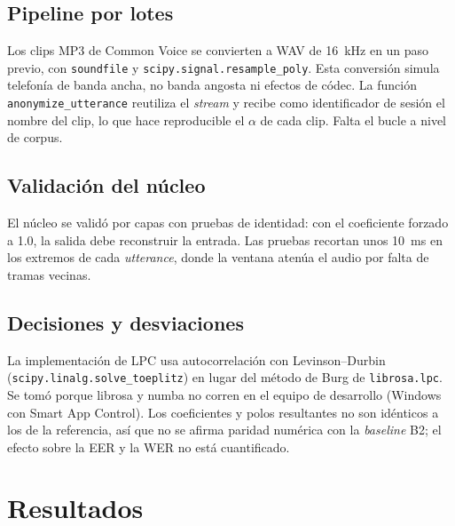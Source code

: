 \subsection{Pipeline por lotes}
Los clips MP3 de Common Voice se convierten a WAV de 16~kHz en un paso previo, 
con \texttt{soundfile} y \texttt{scipy.signal.resample\_poly}. Esta conversión 
simula telefonía de banda ancha, no banda angosta ni efectos de códec. La función 
\texttt{anonymize\_utterance} reutiliza el \textit{stream} y recibe como identificador 
de sesión el nombre del clip, lo que hace reproducible el $\alpha$ de cada clip. 
Falta el bucle a nivel de corpus.

\subsection{Validación del núcleo}
El núcleo se validó por capas con pruebas de identidad: con el coeficiente forzado a 1.0, 
la salida debe reconstruir la entrada. Las pruebas recortan unos 10~ms en los extremos de 
cada \textit{utterance}, donde la ventana atenúa el audio por falta de tramas vecinas.

\subsection{Decisiones y desviaciones}
La implementación de LPC usa autocorrelación con Levinson--Durbin (\texttt{scipy.linalg.solve\_toeplitz}) 
en lugar del método de Burg de \texttt{librosa.lpc}. Se tomó porque librosa y numba no corren en el equipo 
de desarrollo (Windows con Smart App Control). Los coeficientes y polos resultantes no son idénticos a los 
de la referencia, así que no se afirma paridad numérica con la \textit{baseline} B2; el efecto sobre la EER 
y la WER no está cuantificado.

\section{Resultados}

\printbibliography[title={Referencias}]

